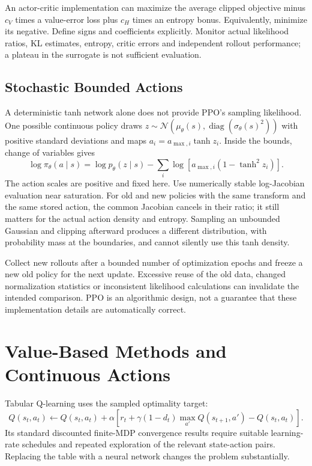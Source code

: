 An actor-critic implementation can maximize the average clipped objective minus $c_V$ times a value-error loss plus $c_H$ times an entropy bonus. Equivalently, minimize its negative. Define signs and coefficients explicitly. Monitor actual likelihood ratios, KL estimates, entropy, critic errors and independent rollout performance; a plateau in the surrogate is not sufficient evaluation.

\subsection{Stochastic Bounded Actions}

A deterministic tanh network alone does not provide PPO's sampling likelihood. One possible continuous policy draws $z\sim\mathcal N(\mu_\theta(s),\operatorname{diag}(\sigma_\theta(s)^2))$ with positive standard deviations and maps $a_i=a_{\max,i}\tanh z_i$. Inside the bounds, change of variables gives
\begin{equation}
\log\pi_\theta(a\mid s)=\log p_\theta(z\mid s)
-\sum_i\log\left[a_{\max,i}(1-\tanh^2z_i)\right].
\end{equation}
The action scales are positive and fixed here. Use numerically stable log-Jacobian evaluation near saturation. For old and new policies with the same transform and the same stored action, the common Jacobian cancels in their ratio; it still matters for the actual action density and entropy. Sampling an unbounded Gaussian and clipping afterward produces a different distribution, with probability mass at the boundaries, and cannot silently use this tanh density.

Collect new rollouts after a bounded number of optimization epochs and freeze a new old policy for the next update. Excessive reuse of the old data, changed normalization statistics or inconsistent likelihood calculations can invalidate the intended comparison. PPO is an algorithmic design, not a guarantee that these implementation details are automatically correct.

\section{Value-Based Methods and Continuous Actions}
\label{sec:value_based_methods}

Tabular Q-learning uses the sampled optimality target:
\begin{equation}
Q(s_t,a_t)\leftarrow Q(s_t,a_t)+\alpha
\left[r_t+\gamma(1-d_t)\max_{a'}Q(s_{t+1},a')-Q(s_t,a_t)\right].
\label{eq:q_learning}
\end{equation}
Its standard discounted finite-MDP convergence results require suitable learning-rate schedules and repeated exploration of the relevant state-action pairs. Replacing the table with a neural network changes the problem substantially.

